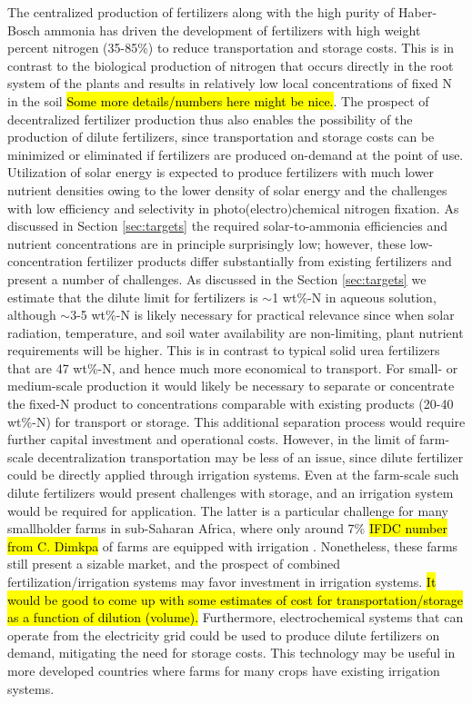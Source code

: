 The centralized production of fertilizers along with the high purity of Haber-Bosch ammonia has driven the development of fertilizers with high weight percent nitrogen (35-85\%) to reduce transportation and storage costs. This is in contrast to the biological production of nitrogen that occurs directly in the root system of the plants and results in relatively low local concentrations of fixed N in the soil \needcite \hl{Some more details/numbers here might be nice.}. The prospect of decentralized fertilizer production thus also enables the possibility of the production of dilute fertilizers, since transportation and storage costs can be minimized or eliminated if fertilizers are produced on-demand at the point of use. Utilization of solar energy is expected to produce fertilizers with much lower nutrient densities owing to the lower density of solar energy \needcite and the challenges with low efficiency and selectivity in photo(electro)chemical nitrogen fixation. As discussed in Section \ref{sec:targets} the required solar-to-ammonia efficiencies and nutrient concentrations are in principle surprisingly low; however, these low-concentration fertilizer products differ substantially from existing fertilizers and present a number of challenges. As discussed in the Section \ref{sec:targets} we estimate that the dilute limit for fertilizers is $\sim$1 wt\%-N in aqueous solution, although $\sim$3-5 wt\%-N is likely necessary for practical relevance since when solar radiation, temperature, and soil water availability are non-limiting, plant nutrient requirements will be higher. This is in contrast to typical solid urea fertilizers that are 47 wt\%-N, and hence much more economical to transport. For small- or medium-scale production it would likely be necessary to separate or concentrate the fixed-N product to concentrations comparable with existing products (20-40 wt\%-N) for transport or storage. This additional separation process would require further capital investment and operational costs. However, in the limit of farm-scale decentralization transportation may be less of an issue, since dilute fertilizer could be directly applied through irrigation systems. Even at the farm-scale such dilute fertilizers would present challenges with storage, and an irrigation system would be required for application. The latter is a particular challenge for many smallholder farms in sub-Saharan Africa, where only around 7\% \hl{IFDC number from C. Dimkpa} of farms are equipped with irrigation \needcite. Nonetheless, these farms still present a sizable market, and the prospect of combined fertilization/irrigation systems may favor investment in irrigation systems. \hl{It would be good to come up with some estimates of cost for transportation/storage as a function of dilution (volume).} Furthermore, electrochemical systems that can operate from the electricity grid could be used to produce dilute fertilizers on demand, mitigating the need for storage costs. This technology may be useful in more developed countries where farms for many crops have existing irrigation systems.

